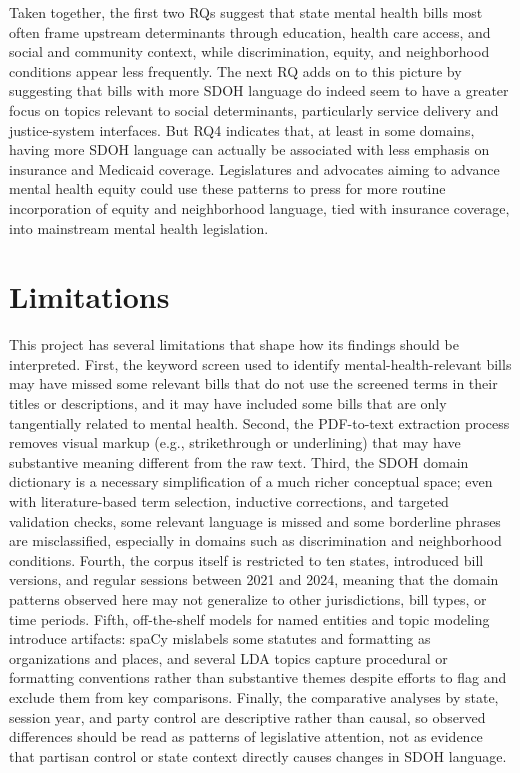 \documentclass[10pt,twocolumn]{article}
\begin{document}
Taken together, the first two RQs suggest that state mental health bills
most often frame upstream determinants through education, health care
access, and social and community context, while discrimination, equity,
and neighborhood conditions appear less frequently. The next RQ adds on
to this picture by suggesting that bills with more SDOH language do
indeed seem to have a greater focus on topics relevant to social
determinants, particularly service delivery and justice-system
interfaces. But RQ4 indicates that, at least in some domains, having
more SDOH language can actually be associated with less emphasis on
insurance and Medicaid coverage. Legislatures and advocates aiming to
advance mental health equity could use these patterns to press for more
routine incorporation of equity and neighborhood language, tied with
insurance coverage, into mainstream mental health legislation.

\section{Limitations}\label{limitations}

This project has several limitations that shape how its findings should
be interpreted. First, the keyword screen used to identify
mental-health-relevant bills may have missed some relevant bills that do
not use the screened terms in their titles or descriptions, and it may
have included some bills that are only tangentially related to mental
health. Second, the PDF-to-text extraction process removes visual markup
(e.g., strikethrough or underlining) that may have substantive meaning
different from the raw text. Third, the SDOH domain dictionary is a
necessary simplification of a much richer conceptual space; even with
literature-based term selection, inductive corrections, and targeted
validation checks, some relevant language is missed and some borderline
phrases are misclassified, especially in domains such as discrimination
and neighborhood conditions. Fourth, the corpus itself is restricted to
ten states, introduced bill versions, and regular sessions between 2021
and 2024, meaning that the domain patterns observed here may not
generalize to other jurisdictions, bill types, or time periods. Fifth,
off-the-shelf models for named entities and topic modeling introduce
artifacts: spaCy mislabels some statutes and formatting as organizations
and places, and several LDA topics capture procedural or formatting
conventions rather than substantive themes despite efforts to flag and
exclude them from key comparisons. Finally, the comparative analyses by
state, session year, and party control are descriptive rather than
causal, so observed differences should be read as patterns of
legislative attention, not as evidence that partisan control or state
context directly causes changes in SDOH language.
\end{document}
